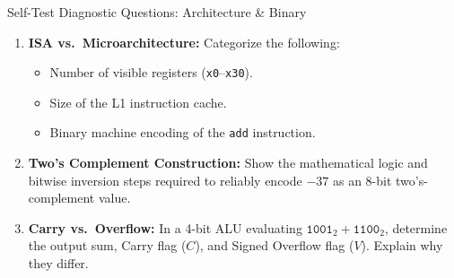 \documentclass[aspectratio=169,11pt,t]{beamer}
\newcommand{\key}[1]{\textbf{#1}}
\newcommand{\bits}[1]{\texttt{#1}}
\newcommand{\code}[1]{\texttt{#1}}
\begin{document}
\begin{frame}{Self-Test Diagnostic Questions: Architecture \& Binary}

\begin{enumerate}\setlength{\itemsep}{6pt}

  \item \key{ISA vs.\ Microarchitecture:} Categorize the following:

  \begin{itemize}\setlength{\itemsep}{1.5pt}
    \item Number of visible registers (\bits{x0}--\bits{x30}).
    \item Size of the L1 instruction cache.
    \item Binary machine encoding of the \code{add} instruction.
  \end{itemize}
  \vspace{0.2cm}

  \item \key{Two's Complement Construction:}
  Show the mathematical logic and bitwise inversion steps required to reliably encode $-37$ as an 8-bit two's-complement value.
  \vspace{0.2cm}

  \item \key{Carry vs.\ Overflow:}
  In a 4-bit ALU evaluating
  \(\mathtt{1001}_2 + \mathtt{1100}_2\),
  determine the output sum, Carry flag ($C$), and Signed Overflow flag ($V$). Explain why they differ.

\end{enumerate}

\vfill
\end{frame}





\end{document}
